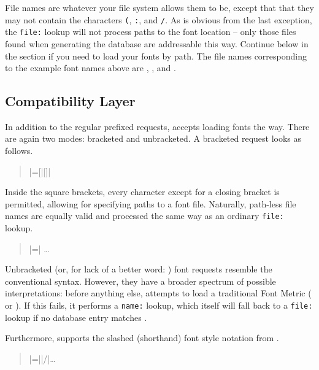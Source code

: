File names are whatever your file system allows them to be, except
that that they may not contain the characters
	\verb|(|,
	\verb|:|, and
	\verb|/|.
%
As is obvious from the last exception, the \verb|file:| lookup will
not process paths to the font location -- only those
files found when generating the database are addressable this way.
%
Continue below in the \XETEX section if you need to load your fonts
by path.
%
The file names corresponding to the example font names above are
	,
	, and
	.

\subsection{Compatibility Layer}

In addition to the regular prefixed requests, 
accepts loading fonts the \XETEX way.
%
There are again two modes: bracketed and unbracketed.
A bracketed request looks as follows.

\begin{quote}
  |\font\fontname=[||]|
\end{quote}

\noindent
Inside the square brackets, every character except for a closing
bracket is permitted, allowing for specifying paths to a font file.
%
Naturally, path-less file names are equally valid and processed the
same way as an ordinary \verb|file:| lookup.

\begin{quote}
  |\font\fontname=| \dots
\end{quote}

Unbracketed (or, for lack of a better word: )
font requests resemble the conventional \TEX syntax.
%
However, they have a broader spectrum of possible interpretations:
before anything else,  attempts to load a
traditional \TEX Font Metric ( or ).
%
If this fails, it performs a \verb|name:| lookup, which itself will
fall back to a \verb|file:| lookup if no database entry matches
.

Furthermore,  supports the slashed (shorthand)
font style notation from \XETEX.

\begin{quote}
  |\font\fontname=||/|\dots
\end{quote}

